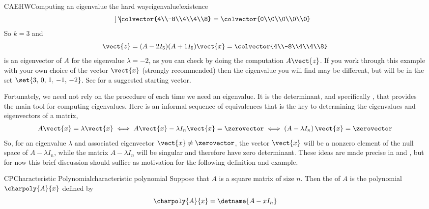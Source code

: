 \begin{example}{CAEHW}{Computing an eigenvalue the hard way}{eigenvalue!existence}
\begin{align*}
\begin{bmatrix}
\end{bmatrix}
\colvector{4\\-8\\4\\4\\8}
=
\colvector{0\\0\\0\\0\\0}\\
\end{align*}
%
So $k=3$ and 
%
\begin{equation*}
\vect{z}=(A-2I_5)(A+1I_5)\vect{x}=\colvector{4\\-8\\4\\4\\8}
\end{equation*}
%
is an eigenvector of $A$ for the eigenvalue $\lambda=-2$, as you can check by doing the computation $A\vect{z}$.  If you work through this example with your own choice of the vector $\vect{x}$ (strongly recommended) then the  eigenvalue you will find may be different, but will be in the set $\set{3,\,0,\,1,\,-1,\,-2}$.  See  for a suggested starting vector.
%
\end{example}
%
%
Fortunately, we need not rely on the procedure of  each time we need an eigenvalue.  It is the determinant, and specifically , that provides the main tool for computing eigenvalues.  Here is an informal sequence of equivalences that is the key to determining the eigenvalues and eigenvectors of a matrix,
%
\begin{equation*}
A\vect{x}=\lambda\vect{x}\iff
A\vect{x}-\lambda I_n\vect{x}=\zerovector\iff
\left(A-\lambda I_n\right)\vect{x}=\zerovector
\end{equation*}
%
So, for an eigenvalue $\lambda$ and associated eigenvector $\vect{x}\neq\zerovector$, the vector $\vect{x}$ will be a nonzero element of the null space of $A-\lambda I_n$, while the matrix $A-\lambda I_n$ will be singular and therefore have zero determinant.  These ideas are made precise in  and , but for now this brief discussion should suffice as motivation for the following definition and example.
%
\begin{definition}{CP}{Characteristic Polynomial}{characteristic polynomial}
Suppose that $A$ is a square matrix of size $n$.  Then the  of $A$ is the polynomial $\charpoly{A}{x}$ defined by
%
\begin{equation*}
\charpoly{A}{x}=\detname{A-xI_n}
\end{equation*}
%
\end{definition}
